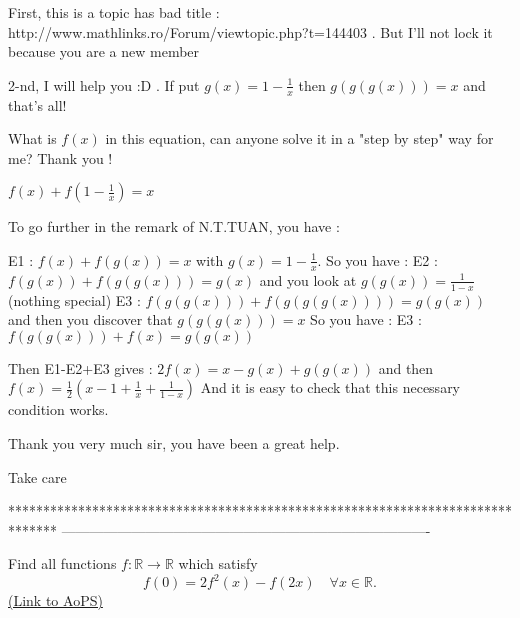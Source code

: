 \begin{mysolution}
	First, this is a topic has bad title : http://www.mathlinks.ro/Forum/viewtopic.php?t=144403 . But I'll not lock it because you are a new member   

2-nd, I will help you :D . If put $g(x)=1-\frac{1}{x}$ then $g(g(g(x)))=x$ and that's all!  
\end{mysolution}



\begin{mysolution}
	\begin{tcolorbox}What is $f(x)$ in this equation, can anyone solve it in a "step by step" way for me? Thank you !

$f(x)+f(1-\frac{1}{x})=x$\end{tcolorbox}

To go further in the remark of N.T.TUAN, you have :

E1 : $f(x)+f(g(x))=x$ with $g(x)=1-\frac{1}{x}$. So you have :
E2 : $f(g(x))+f(g(g(x)))=g(x)$ and you look at $g(g(x))=\frac{1}{1-x}$ (nothing special)
E3 : $f(g(g(x)))+f(g(g(g(x))))=g(g(x))$ and then you discover that $g(g(g(x)))=x$ So you have :
E3 : $f(g(g(x)))+f(x)=g(g(x))$ 

Then E1-E2+E3 gives : $2f(x)=x-g(x)+g(g(x))$ and then $f(x)=\frac{1}{2}(x-1+\frac{1}{x}+\frac{1}{1-x})$
And it is easy to check that this necessary condition works.
\end{mysolution}



\begin{mysolution}
	Thank you very much sir, you have been a great help.

Take care
\end{mysolution}
*******************************************************************************
-------------------------------------------------------------------------------

\begin{problem}
	Find all functions $f: \mathbb{R}\rightarrow \mathbb{R}$ which satisfy
\[f(0)=2f^{2}(x)-f(2x) \quad \forall x \in \mathbb R.\]
	\flushright \href{https://artofproblemsolving.com/community/c6h153054}{(Link to AoPS)}
\end{problem}



